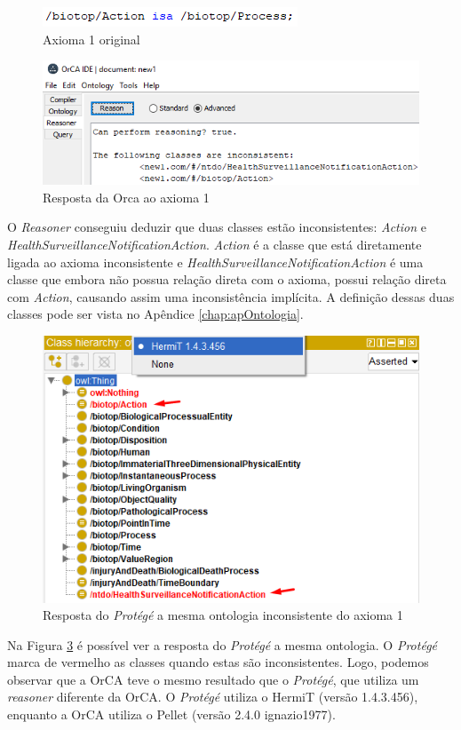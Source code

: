 \documentclass{bcc}
\begin{document}
\begin{figure}[H]
\centering
\includegraphics[width=.5\textwidth]{Figuras/axiomai_1_o.png}
\caption{Axioma 1 original} 
\label{fig:axiomai_1_o}
\end{figure}

\begin{figure}[H]
\centering
\includegraphics[width=.6\textwidth]{Figuras/axiomai_1_res.png}
\caption{Resposta da Orca ao axioma 1} 
\label{fig:axiomai_1_res}
\end{figure}

O \textit{Reasoner} conseguiu deduzir que duas classes estão inconsistentes: \textit{Action} e \textit{HealthSurveillanceNotificationAction}. \textit{Action} é a classe que está diretamente ligada ao axioma inconsistente e \textit{HealthSurveillanceNotificationAction} é uma classe que embora não possua relação direta com o axioma, possui relação direta com \textit{Action}, causando assim uma inconsistência implícita. A definição dessas duas classes pode ser vista no Apêndice \ref{chap:apOntologia}.

\begin{figure}[H]
\centering
\includegraphics[width=.6\textwidth]{Figuras/axiomai_1_protege.png}
\caption{Resposta do \textit{Protégé} a mesma ontologia inconsistente do axioma 1} 
\label{fig:axiomai_1_protege}
\end{figure}

Na Figura \ref{fig:axiomai_1_protege} é possível ver a resposta do \textit{Protégé} a mesma ontologia. O \textit{Protégé} marca de vermelho as classes quando estas são inconsistentes. Logo, podemos observar que a OrCA teve o mesmo resultado que o \textit{Protégé}, que utiliza um \textit{reasoner} diferente da OrCA. O \textit{Protégé} utiliza o HermiT (versão 1.4.3.456), enquanto a OrCA utiliza o Pellet (versão 2.4.0 ignazio1977).
\end{document}
